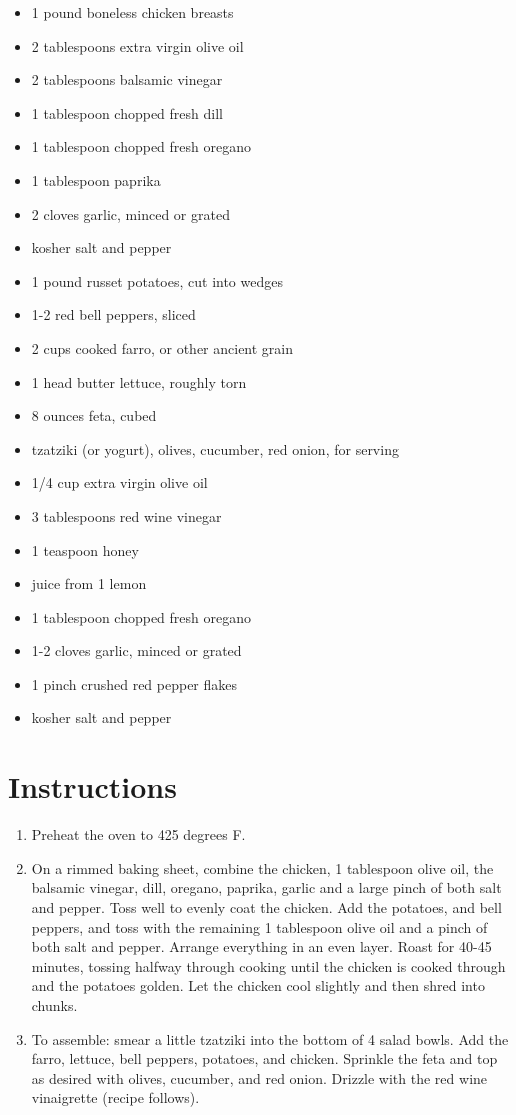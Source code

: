 \documentclass[
  letterpaper,
  DIV=11,
  numbers=noendperiod,
  titlepage=false]{scrreprt}
\providecommand{\tightlist}{%
  \setlength{\itemsep}{0pt}\setlength{\parskip}{0pt}}\usepackage{longtable,booktabs,array}
\begin{document}
\begin{itemize}
\tightlist
\item
  1 pound boneless chicken breasts
\item
  2 tablespoons extra virgin olive oil
\item
  2 tablespoons balsamic vinegar
\item
  1 tablespoon chopped fresh dill
\item
  1 tablespoon chopped fresh oregano
\item
  1 tablespoon paprika
\item
  2 cloves garlic, minced or grated
\item
  kosher salt and pepper
\item
  1 pound russet potatoes, cut into wedges
\item
  1-2 red bell peppers, sliced
\item
  2 cups cooked farro, or other ancient grain
\item
  1 head butter lettuce, roughly torn
\item
  8 ounces feta, cubed
\item
  tzatziki (or yogurt), olives, cucumber, red onion, for serving
\item
  1/4 cup extra virgin olive oil
\item
  3 tablespoons red wine vinegar
\item
  1 teaspoon honey
\item
  juice from 1 lemon
\item
  1 tablespoon chopped fresh oregano
\item
  1-2 cloves garlic, minced or grated
\item
  1 pinch crushed red pepper flakes
\item
  kosher salt and pepper
\end{itemize}

\section{Instructions}\label{instructions-27}

\begin{enumerate}
\def\labelenumi{\arabic{enumi}.}
\tightlist
\item
  Preheat the oven to 425 degrees F.
\item
  On a rimmed baking sheet, combine the chicken, 1 tablespoon olive oil,
  the balsamic vinegar, dill, oregano, paprika, garlic and a large pinch
  of both salt and pepper. Toss well to evenly coat the chicken. Add the
  potatoes, and bell peppers, and toss with the remaining 1 tablespoon
  olive oil and a pinch of both salt and pepper. Arrange everything in
  an even layer. Roast for 40-45 minutes, tossing halfway through
  cooking until the chicken is cooked through and the potatoes golden.
  Let the chicken cool slightly and then shred into chunks.
\item
  To assemble: smear a little tzatziki into the bottom of 4 salad bowls.
  Add the farro, lettuce, bell peppers, potatoes, and chicken. Sprinkle
  the feta and top as desired with olives, cucumber, and red onion.
  Drizzle with the red wine vinaigrette (recipe follows).
\end{enumerate}
\end{document}

